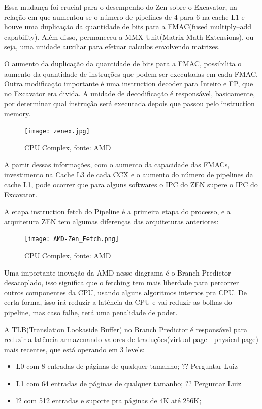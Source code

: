 \documentclass[12pt]{article}
\begin{document}
Essa mudança foi crucial para o desempenho do Zen sobre o Excavator, na relação em que aumentou-se o número de pipelines de 4 para 6 na cache L1 e houve uma duplicação da quantidade de bits para a FMAC(fused multiply–add capability). Além disso, permaneceu a MMX Unit(Matrix Math Extensions), ou seja, uma unidade auxiliar para efetuar calculos envolvendo matrizes. 

O aumento da duplicação da quantidade de bits para a FMAC, possibilita o aumento da quantidade de instruções que podem ser executadas em cada FMAC. Outra modificação importante é uma instruction decoder para Inteiro e FP, que no Excavator era divida. A unidade de decodificação é responsável, basicamente, por determinar qual instrução será executada depois que passou pelo instruction memory.


\begin{figure}[H]
\centering
\texttt{[image: zenex.jpg]}
\caption{CPU Complex, fonte: AMD}
\label{fig:AMD CORE}
\end{figure}

A partir dessas informações, com o aumento da capacidade das FMACs, investimento na Cache L3 de cada CCX e o aumento do número de pipelines da cache L1, pode ocorrer que para alguns softwares o IPC do ZEN supere o IPC do Excavator.

A etapa instruction fetch do Pipeline é a primeira etapa do processo, e a arquitetura ZEN tem algumas diferenças das arquiteturas anteriores:

\begin{figure}[H]
\centering
\texttt{[image: AMD-Zen\_Fetch.png]}
\caption{CPU Complex, fonte: AMD}
\label{fig:AMD CORE}
\end{figure}

Uma importante inovação da AMD nesse diagrama é o Branch Predictor desacoplado, isso significa que o fetching tem mais liberdade para percorrer outros componentes da CPU, usando alguns algoritmos internos pra CPU. De certa forma, isso irá reduzir a latência da CPU e vai reduzir as bolhas do pipeline, mas caso falhe, terá uma penalidade de poder.

A TLB(Translation Lookaside Buffer) no Branch Predictor é responsável para reduzir a latência armazenando valores de traduções(virtual page - physical page) mais recentes, que está operando em 3 levels:

\begin{itemize}
	\item L0 com 8 entradas de páginas de qualquer tamanho; ?? Perguntar Luiz
	\item L1 com 64 entradas de páginas de qualquer tamanho; ?? Perguntar Luiz
	\item l2 com 512 entradas e suporte pra páginas de 4K até 256K;
\end{itemize}
\end{document}
